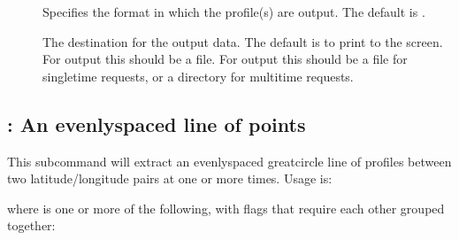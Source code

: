 \documentclass[letterpaper,10pt,english]{sphinxmanual}
\begin{document}
\sphinxAtStartPar
{}
\begin{description}
\item[{}] \leavevmode
\sphinxAtStartPar
Specifies the format in which the profile(s) are output.  The default is .

\item[{}] \leavevmode
\sphinxAtStartPar
The destination for the output data.  The default is to print to the screen.  For  output this should be a file.  For  output this should be a file for single\sphinxhyphen{}time requests, or a directory for multi\sphinxhyphen{}time requests.

\item[{}] \leavevmode
\sphinxAtStartPar
{}

\sphinxAtStartPar
{}

\end{description}


\subsection{: An evenly\sphinxhyphen{}spaced line of points}
\label{\detokenize{userguide:line-an-evenly-spaced-line-of-points}}
\sphinxAtStartPar
This subcommand will extract an evenly\sphinxhyphen{}spaced great\sphinxhyphen{}circle line of profiles between two latitude/longitude pairs at one or more times.  Usage is:

\sphinxAtStartPar
{}

\sphinxAtStartPar
where \sphinxcode{\sphinxupquote{{[}flags{]}}} is one or more of the following, with flags that require each other grouped together:
\end{document}

